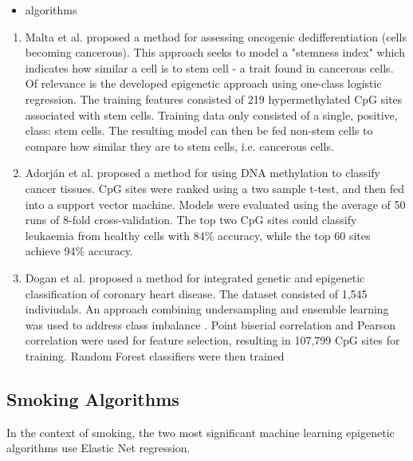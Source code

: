 \documentclass{article}
\begin{document}
\begin{itemize}
    \item algorithms
\end{itemize}
\begin{enumerate}
    \item Malta et al. \cite{malta2018machine} proposed a method for assessing oncogenic dedifferentiation (cells becoming cancerous). This approach seeks to model a "stemness index" which indicates how similar a cell is to stem cell - a trait found in cancerous cells. Of relevance is the developed epigenetic approach using one-class logistic regression. The training features consisted of 219 hypermethylated CpG sites associated with stem cells. Training data only consisted of a single, positive, class: stem cells. The resulting model can then be fed non-stem cells to compare how similar they are to stem cells, i.e. cancerous cells.

    \item Adorj\'an et al. \cite{adorjan2002tumour} proposed a method for using DNA methylation to classify cancer tissues. CpG sites were ranked using a two sample t-test, and then fed into a support vector machine. Models were evaluated using the average of 50 runs of 8-fold cross-validation. The top two CpG sites could classify leukaemia from healthy cells with 84\% accuracy, while the top 60 sites achieve 94\% accuracy.

    \item Dogan et al. \cite{dogan2018integrated} proposed a method for integrated genetic and epigenetic classification of coronary heart disease. The dataset consisted of 1,545 indiviudals. An approach combining undersampling and ensemble learning was used to address class imbalance \cite{liu2008exploratory}. Point biserial correlation and Pearson correlation were used for feature selection, resulting in 107,799 CpG sites for training. Random Forest classifiers were then trained
\end{enumerate}

\subsection{Smoking Algorithms}
In the context of smoking, the two most significant machine learning epigenetic algorithms use Elastic Net regression.
\end{document}
